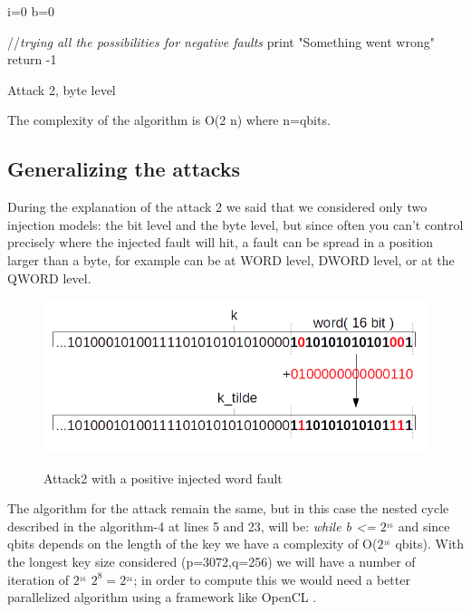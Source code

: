 \documentclass[11pt,english]{article}
\begin{document}
\begin{itemize}
\begin{algorithm}[H]
  i=0\;  
  b=0\;
  
  //\textit{trying all the possibilities for negative faults}\;
  print "Something went wrong"\;
  return -1

  \caption{Attack 2, byte level}
\end{algorithm}
\end{itemize}

The complexity of the algorithm is O(2  \cdot n) where n=qbits.

\subsection{Generalizing the attacks}
During the explanation of the attack 2 we said that we considered only two injection models: the bit level and the byte level, but since often you can't control precisely where the injected fault will hit, a fault can be spread in a position larger than a byte, for example can be at WORD level, DWORD level, or at the QWORD level. 

\begin{figure}[H]
\includegraphics[width=1.0\textwidth]{img/attack2word.png} \\
\caption{\label{f_etichetta}Attack2 with a positive injected word fault }
\end{figure}

The algorithm for the attack remain the same, but in this case the nested cycle described in the algorithm-4 at lines 5 and 23, will be: \textit{while b <= $2^_{16}$} and since qbits depends on the length of the key we have a complexity of O($2^_{16}$ \cdot qbits). With the longest key size considered (p=3072,q=256) we will have a number of iteration of $2^_{16}$ \cdot $2^{8} = 2^_{24}$; in order to compute this we would need a better parallelized algorithm using a framework like OpenCL \cite{opencl}.
\end{document}
